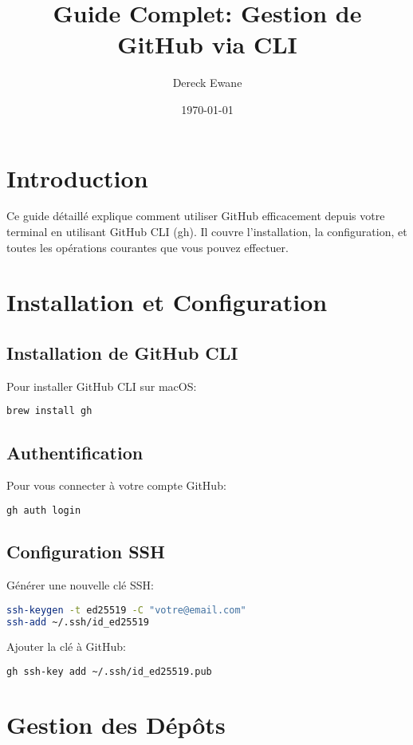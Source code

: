 \documentclass[11pt,a4paper]{article}
\title{Guide Complet: Gestion de GitHub via CLI}
\author{Dereck Ewane}
\date{\today}
\begin{document}
\maketitle
\tableofcontents
\newpage

\section{Introduction}
Ce guide détaillé explique comment utiliser GitHub efficacement depuis votre terminal en utilisant GitHub CLI (gh). Il couvre l'installation, la configuration, et toutes les opérations courantes que vous pouvez effectuer.

\section{Installation et Configuration}
\subsection{Installation de GitHub CLI}
Pour installer GitHub CLI sur macOS:
\begin{lstlisting}[language=bash]
brew install gh
\end{lstlisting}

\subsection{Authentification}
Pour vous connecter à votre compte GitHub:
\begin{lstlisting}[language=bash]
gh auth login
\end{lstlisting}

\subsection{Configuration SSH}
Générer une nouvelle clé SSH:
\begin{lstlisting}[language=bash]
ssh-keygen -t ed25519 -C "votre@email.com"
ssh-add ~/.ssh/id_ed25519
\end{lstlisting}

Ajouter la clé à GitHub:
\begin{lstlisting}[language=bash]
gh ssh-key add ~/.ssh/id_ed25519.pub
\end{lstlisting}

\section{Gestion des Dépôts}
\end{document}

